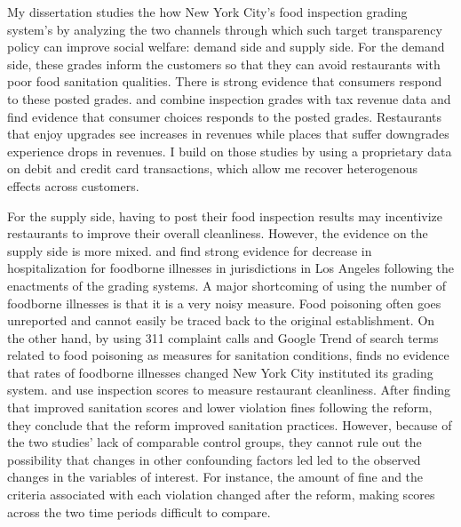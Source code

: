\documentclass[12pt]{article}
\begin{document}
My dissertation studies the how New York City's food inspection grading system's by analyzing the two channels through which such target transparency policy can improve social welfare: demand side and supply side. For the demand side, these grades inform the customers so that they can avoid restaurants with poor food sanitation qualities. There is strong evidence that consumers respond to these posted grades. \cite{jie_leslie_05} and \cite{jie_leslie_09} combine inspection grades with tax revenue data and find evidence that consumer choices responds to the posted grades. Restaurants that enjoy upgrades see increases in revenues while places that suffer downgrades experience drops in revenues. I build on those studies by using a proprietary data on debit and credit card transactions, which allow me recover heterogenous effects across customers. 

For the supply side, having to post their food inspection results may incentivize restaurants to improve their overall cleanliness. However, the evidence on the supply side is more mixed. \cite{jie_leslie_05} and \cite{Simon_05} find strong evidence for decrease in hospitalization for foodborne illnesses in jurisdictions in Los Angeles following the enactments of the grading systems. A major shortcoming of using the number of foodborne illnesses is that it is a very noisy measure. Food poisoning often goes unreported and cannot easily be traced back to the original establishment. On the other hand, by using 311 complaint calls and Google Trend of search terms related to food poisoning as measures for sanitation conditions, \cite{Ho_2012} finds no evidence that rates of foodborne illnesses changed New York City instituted its grading system.  \cite{Wong_at_el_2015} and \cite{Meltzer_2015} use inspection scores to measure restaurant cleanliness. After finding that improved sanitation scores and lower violation fines following the reform, they conclude that the reform improved sanitation practices. However, because of the two studies' lack of comparable control groups, they cannot rule out the possibility that changes in other confounding factors led led to the observed changes in the variables of interest.  For instance, the amount of fine and the criteria associated with each violation changed after the reform, making scores across the two time periods difficult to compare. 
\end{document}
